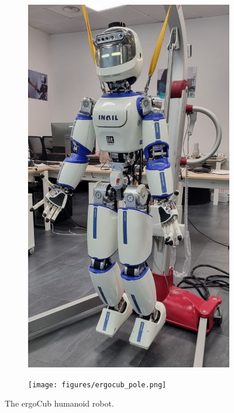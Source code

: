 \begin{figure}[t]
\centering
\begin{subfigure}{.49\columnwidth}
  \includegraphics[width=\textwidth]{figures/ergocub_crain.png}
  \label{fig:ergocub_front}
\end{subfigure}%
\hspace{\fill} %
\begin{subfigure}{.49\columnwidth}
  \texttt{[image: figures/ergocub\_pole.png]}
  \label{fig:ergocub_lat}
\end{subfigure}
\vspace{-20pt}
\caption{The ergoCub humanoid robot.}
\label{fig:ergocub}
\vspace{-20pt}
\end{figure}
